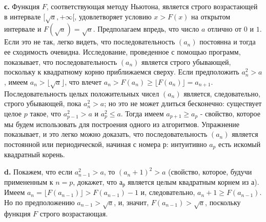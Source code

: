 \documentclass{mai_book}
\begin{document}
\textbf{с.} Функция $F$, соответствующая методу Ньютона, является строго возрастающей в интервале $[\sqrt{a}, + \infty [$, удовлетворяет условию $x > F(x)$ на открытом интервале и $F(\sqrt{a}) = \sqrt{a}$. Предполагаем впредь, что число $a$ отлично от $0$ и $1$. Если это не так, легко видеть, что последовательность $(a_{n})$ постоянна и тогда ее сходимость очевидна. Исследование, проведенное с помощью программ, показывает, что последовательность $(a_{n})$ является строго убывающей, поскольку к квадратному корню приближаемся сверху. Если предположить $a_{n}^{2} > a$, имеем $a_{n} > \lfloor \sqrt{a} \rfloor$, что влечет $a_{n} > F(a_{n}) \geqslant \lfloor F(a_{n}) \rfloor = a_{n+1}$. 
Последовательность целых положительных чисел $(a_{n})$ является, следовательно, строго убывающей, пока $a_{n}^{2} > a$; но это не может длиться бесконечно: существует целое $p$ такое, что $a^{2}_{p-1} > a$ и $a^{2}_{p} \leqslant a$. Тогда имеем $a_{p+1} \geqslant a_{p}$ - свойство, которое мы будем использовать для построения одного из алгоритмов. Упражнение показывает, и это легко можно доказать, что последовательность $(a_{n})$ является постоянной или периодической, начиная с номера $р$: интуитивно $a_{p}$ есть искомый квадратный корень.
\newpage

\restoretop
{}
\textbf{d.} Покажем, что если $a^{2}_{n-1} > a$, то $(a_{n} + 1)^{2} > a$ (свойство, которое, будучи примененным к $n = p$, докажет, что $а_{р}$ является целым квадратным корнем из $а$). Имеем $a_{n} = \lfloor F(a_{n-1}) \rfloor > F(a_{n-1}) - 1$ и, следовательно, $a_{n} + 1 \geqslant F(a_{n-1})$. Но по предположению $a_{n-1} > \sqrt{a}$, и, значит, $F(a_{n-1}) > \sqrt{a}$, поскольку функция $F$ строго возрастающая.
\end{document}
